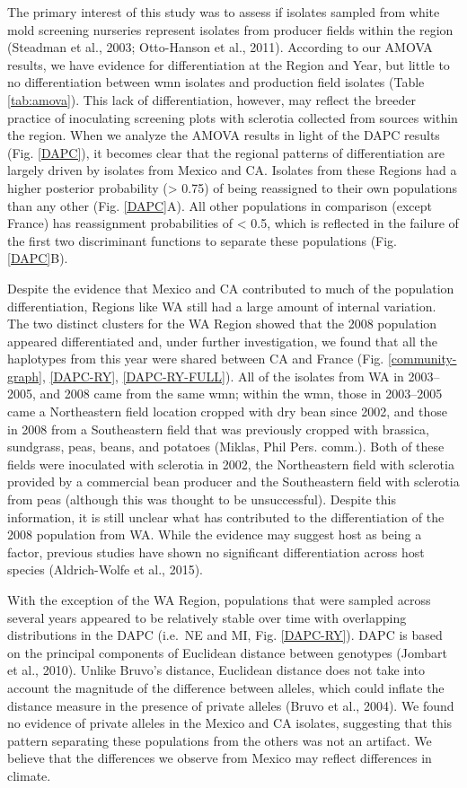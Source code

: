 \documentclass[fleqn,10pt,lineno]{wlpeerj} %
\theoremstyle{definition}
\theoremstyle{definition}
\theoremstyle{definition}
\theoremstyle{remark}
\begin{document}
The primary interest of this study was to assess if isolates sampled
from white mold screening nurseries represent isolates from producer
fields within the region (Steadman et al., 2003; Otto-Hanson et al.,
2011). According to our AMOVA results, we have evidence for
differentiation at the Region and Year, but little to no differentiation
between wmn isolates and production field isolates (Table
\ref{tab:amova}). This lack of differentiation, however, may reflect the
breeder practice of inoculating screening plots with sclerotia collected
from sources within the region. When we analyze the AMOVA results in
light of the DAPC results (Fig. \ref{DAPC}), it becomes clear that the
regional patterns of differentiation are largely driven by isolates from
Mexico and CA. Isolates from these Regions had a higher posterior
probability (\textgreater{} 0.75) of being reassigned to their own
populations than any other (Fig. \ref{DAPC}A). All other populations in
comparison (except France) has reassignment probabilities of \textless{}
0.5, which is reflected in the failure of the first two discriminant
functions to separate these populations (Fig. \ref{DAPC}B).

Despite the evidence that Mexico and CA contributed to much of the
population differentiation, Regions like WA still had a large amount of
internal variation. The two distinct clusters for the WA Region showed
that the 2008 population appeared differentiated and, under further
investigation, we found that all the haplotypes from this year were
shared between CA and France (Fig. \ref{community-graph}, \ref{DAPC-RY},
\ref{DAPC-RY-FULL}). All of the isolates from WA in 2003--2005, and 2008
came from the same wmn; within the wmn, those in 2003--2005 came a
Northeastern field location cropped with dry bean since 2002, and those
in 2008 from a Southeastern field that was previously cropped with
brassica, sundgrass, peas, beans, and potatoes (Miklas, Phil Pers.
comm.). Both of these fields were inoculated with sclerotia in 2002, the
Northeastern field with sclerotia provided by a commercial bean producer
and the Southeastern field with sclerotia from peas (although this was
thought to be unsuccessful). Despite this information, it is still
unclear what has contributed to the differentiation of the 2008
population from WA. While the evidence may suggest host as being a
factor, previous studies have shown no significant differentiation
across host species (Aldrich-Wolfe et al., 2015).

With the exception of the WA Region, populations that were sampled
across several years appeared to be relatively stable over time with
overlapping distributions in the DAPC (i.e.~NE and MI, Fig.
\ref{DAPC-RY}). DAPC is based on the principal components of Euclidean
distance between genotypes (Jombart et al., 2010). Unlike Bruvo's
distance, Euclidean distance does not take into account the magnitude of
the difference between alleles, which could inflate the distance measure
in the presence of private alleles (Bruvo et al., 2004). We found no
evidence of private alleles in the Mexico and CA isolates, suggesting
that this pattern separating these populations from the others was not
an artifact. We believe that the differences we observe from Mexico may
reflect differences in climate.
\end{document}
